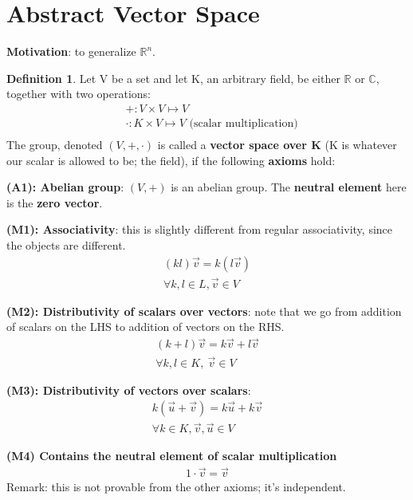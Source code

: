 \documentclass[a4paper, 12pt]{article}
\theoremstyle{definition}
\theoremstyle{definition}
\newtheorem{defn}{Definition}[section]
\theoremstyle{definition}
\theoremstyle{definition}
\newenvironment{enumerate_tight}{
	\begin{enumerate}
		\setlength{\itemsep}{0pt}
		\setlength{\parskip}{0pt}
	}{\end{enumerate}}
\begin{document}
{\section{Abstract Vector Space}
\textbf{Motivation}: to generalize $\mathbb{R}^n$. 
\begin{defn}
	Let V be a set and let K, an arbitrary field, be either $\mathbb{R}$ or $\mathbb{C}$, together with two operations: 
	\begin{align}
		& + : V \times V \mapsto V \\
		& \cdot : K \times V \mapsto V \mbox{ (scalar multiplication)} \\ 	
	\end{align}
	The group, denoted $(V, +, \cdot)$ is called a \textbf{vector space over K} (K is whatever our scalar is allowed to be; the field), if the following \textbf{axioms} hold: 
	\begin{enumerate_tight}
		\item \textbf{(A1): Abelian group}: $(V, +)$ is an abelian group. The \textbf{neutral element} here is the \textbf{zero vector}. 
		\item \textbf{(M1): Associativity}: this is slightly different from regular associativity, since the objects are different.
		\begin{align*}  
		 (kl)\vec{v} = k(l\vec{v})\\ \forall k,l \in L, \vec{v} \in V
		 \end{align*} 
		\item \textbf{(M2): Distributivity of scalars over vectors}: note that we go from addition of scalars on the LHS to addition of vectors on the RHS.
		\begin{align*}  
		(k + l)\vec{v} = k \vec{v} + l \vec{v}\\ \forall k, l \in K,\ \vec{v} \in V 
		\end{align*} 
		\item \textbf{(M3): Distributivity of vectors over scalars}: 
		\begin{align*}
			k( \vec{u} + \vec{v}) = k \vec{u} + k \vec{v} \\
			\forall k \in K, \vec{v}, \vec{u} \in V
		\end{align*}
		\item \textbf{(M4) Contains the neutral element of scalar multiplication} 
		\begin{align*}
			1 \cdot \vec{v} = \vec{v} 
		\end{align*}
		Remark: this is not provable from the other axioms; it's independent. 
	\end{enumerate_tight}
\end{defn}

}
\end{document}
